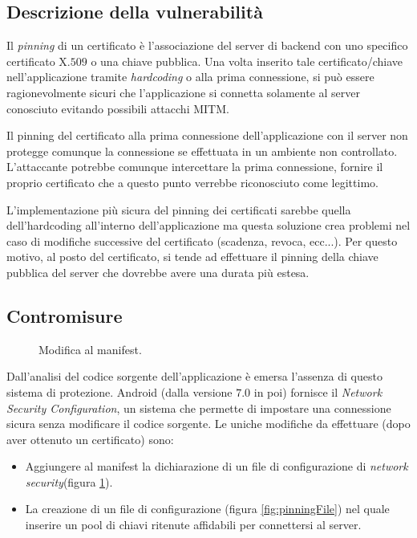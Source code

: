 \subsection{Descrizione della vulnerabilità}
Il \emph{pinning} di un certificato è l'associazione del server di backend con uno specifico certificato X.$509$ o una chiave pubblica. Una volta inserito tale certificato/chiave nell'applicazione tramite \emph{hardcoding} o alla prima connessione, si può essere ragionevolmente sicuri che l'applicazione si connetta solamente al server conosciuto evitando possibili attacchi \ac{MITM}.

Il pinning del certificato alla prima connessione dell'applicazione con il server non protegge comunque la connessione se effettuata in un ambiente non controllato. L'attaccante potrebbe comunque intercettare la prima connessione, fornire il proprio certificato che a questo punto verrebbe riconosciuto come legittimo. 

L'implementazione più sicura del pinning dei certificati sarebbe quella dell'hardcoding all'interno dell'applicazione ma questa soluzione crea problemi nel caso di modifiche successive del certificato (scadenza, revoca, ecc...). Per questo motivo, al posto del certificato, si tende ad effettuare il pinning della chiave pubblica del server che dovrebbe avere una durata più estesa.

\subsection{Contromisure}

\begin{figure}[h]
	\centering 
	\caption{Modifica al manifest.}
	\label{fig:pinningManifest}
\end{figure}

Dall'analisi del codice sorgente dell'applicazione è emersa l'assenza di questo sistema di protezione. Android (dalla versione $7.0$ in poi) fornisce il \emph{Network Security Configuration}, un sistema che permette di impostare una connessione sicura senza modificare il codice sorgente. Le uniche modifiche da effettuare (dopo aver ottenuto un certificato) sono: 
	\begin{itemize}
		\item Aggiungere al manifest la dichiarazione di un file di configurazione di \emph{network security}(figura \ref{fig:pinningManifest}).
		\item La creazione di un file di configurazione (figura \ref{fig:pinningFile}) nel quale inserire un pool di chiavi ritenute affidabili per connettersi al server.
	\end{itemize}

